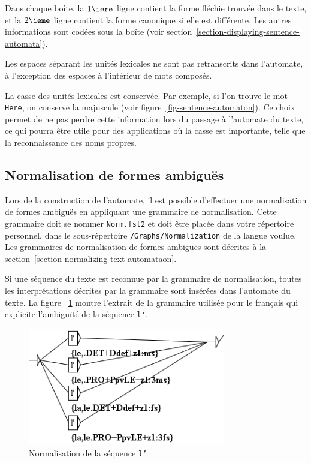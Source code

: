 
\bigskip
\noindent Dans chaque boîte, la $1\iere$  ligne contient la forme fléchie trouvée dans le texte, et
la $2\ieme$ ligne contient la forme canonique si elle est différente. Les autres informations sont
codées sous la boîte (voir section~\ref{section-displaying-sentence-automata}).

\bigskip
\noindent Les espaces séparant les unités lexicales ne sont pas retranscrits dans l’automate, 
à l’exception des espaces à l’intérieur de mots composés.


\bigskip
\noindent La casse des unités lexicales est conservée. Par exemple, si l’on trouve le mot
\verb+Here+, on conserve la majuscule (voir figure~\ref{fig-sentence-automaton}). Ce choix permet 
de ne pas perdre cette information lors du passage à l’automate du texte, ce qui pourra être utile
pour des applications où la casse est importante, telle que la reconnaissance des noms propres.


\subsection{Normalisation de formes ambiguës}
Lors de la construction de l’automate, il est possible d’effectuer une normalisation de
formes ambiguës en appliquant une grammaire de normalisation. Cette grammaire doit
se nommer \verb+Norm.fst2+ et doit être placée dans votre répertoire personnel, dans le sous-répertoire
 \verb+/Graphs/Normalization+ de la langue voulue. Les grammaires de normalisation de formes ambiguës sont décrites à la section~\ref{section-normalizing-text-automataon}.

\bigskip
\noindent Si une séquence du texte est reconnue par la grammaire de normalisation, toutes les
interprétations décrites par la grammaire sont insérées dans l’automate du texte. La figure
~\ref{fig-example-tfst-normalization-graph} montre l’extrait de la grammaire utilisée pour
le français qui explicite l’ambiguïté de la séquence \verb+l'+.

\begin{figure}[!ht]
\begin{center}
\includegraphics[width=8.6cm]{resources/img/fig7-4.png}
\caption{Normalisation de la séquence \texttt{l'}\label{fig-example-tfst-normalization-graph}}
\end{center}
\end{figure}

